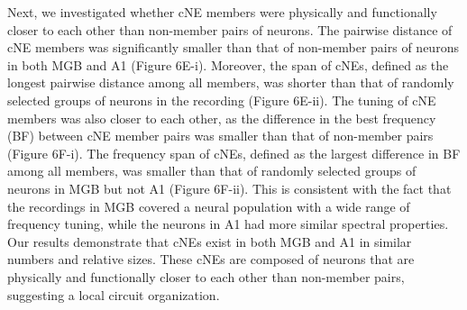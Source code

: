 \documentclass[11pt]{article}
\begin{document}
Next, we investigated whether cNE members were physically and functionally closer to each other than non-member pairs of neurons. The pairwise distance of cNE members was significantly smaller than that of non-member pairs of neurons in both MGB and A1 (Figure 6E-i). Moreover, the span of cNEs, defined as the longest pairwise distance among all members, was shorter than that of randomly selected groups of neurons in the recording (Figure 6E-ii). The tuning of cNE members was also closer to each other, as the difference in the best frequency (BF) between cNE member pairs was smaller than that of non-member pairs (Figure 6F-i). The frequency span of cNEs, defined as the largest difference in BF among all members, was smaller than that of randomly selected groups of neurons in MGB but not A1 (Figure 6F-ii). This is consistent with the fact that the recordings in MGB covered a neural population with a wide range of frequency tuning, while the neurons in A1 had more similar spectral properties. Our results demonstrate that cNEs exist in both MGB and A1 in similar numbers and relative sizes. These cNEs are composed of neurons that are physically and functionally closer to each other than non-member pairs, suggesting a local circuit organization.
\end{document}
